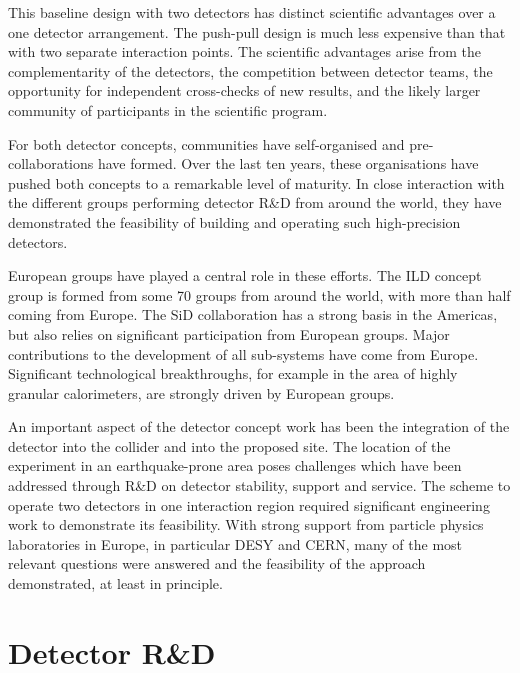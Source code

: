 \documentclass[%
 reprint,
 amsmath,amssymb,
 aps,
]{revtex4-1}
\begin{document}
This baseline design with two detectors
has distinct scientific advantages over a
one detector arrangement.
The push-pull design is much less expensive than 
that with two separate interaction points. 
The scientific advantages arise from the
complementarity of the detectors, the competition between detector
teams, the opportunity for independent cross-checks of new results,
and
 the likely larger community of participants in the scientific program. 

For both detector concepts, communities have self-organised and
pre-collaborations have formed. Over the last ten years, 
 these organisations have pushed both concepts to a remarkable level of
maturity. In close interaction with the different groups
performing detector R\&D from around the world, they have demonstrated the
feasibility of building  and operating such high-precision 
detectors. 

European groups have played a central role in these efforts. The ILD
concept group is formed from some 70 groups from around the world,
with more than half coming from Europe. The SiD collaboration has a
strong basis in the Americas, but also relies on significant
participation from European groups. Major contributions to the
development of all sub-systems have come from Europe. Significant
technological breakthroughs, for example in the area of highly granular
calorimeters, are
 strongly driven by European groups. 

An important aspect of the detector concept work has been
the integration of the detector into the collider and into the
proposed site. The location of the experiment in an earthquake-prone
area poses challenges which have been addressed through R\&D on
detector stability, support and service. The scheme to operate two
detectors in one interaction region required
significant engineering work to demonstrate its
feasibility. With strong support from particle physics laboratories in
Europe, in  particular DESY and CERN, many of the most relevant
questions were answered and the feasibility
 of the approach demonstrated, at least in principle. 


\vspace{-.4cm}


\section{\label{sec:detectrd} Detector R\&D}

\vspace{-.3cm}
\end{document}

